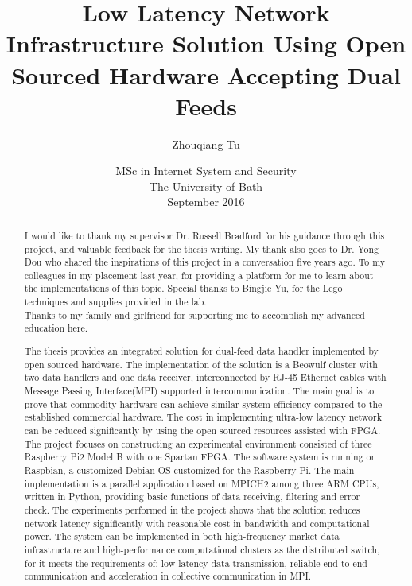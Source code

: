 \documentclass[11pt,openright,a4paper]{report}
\title{Low Latency Network Infrastructure Solution Using Open Sourced Hardware Accepting Dual Feeds}
\author{Zhouqiang Tu}
\date{MSc in Internet System and Security\\The University of Bath\\September 2016}
\begin{document}
\lstset{language=Java,breaklines,breakatwhitespace,basicstyle=\small}


\setcounter{page}{0}


\maketitle
\newpage


\newpage


\newpage
\renewcommand{\abstractname}{Acknowledgements}
\begin{abstract}
I would like to thank my supervisor Dr. Russell Bradford for his guidance through this project, and valuable feedback for the thesis writing. My thank also goes to Dr. Yong Dou who shared the inspirations of this project in a conversation five years ago. To my colleagues in my placement last year, for providing a platform for me to learn about the implementations of this topic. Special thanks to Bingjie Yu, for the Lego techniques and supplies provided in the lab.\\
Thanks to my family and girlfriend for supporting me to accomplish my advanced education here.\\
\end{abstract}

\renewcommand{\abstractname}{Abstract}
\begin{abstract}
	The thesis provides an integrated solution for dual-feed data handler implemented by open sourced hardware. The implementation of the solution is a Beowulf cluster with two data handlers and one data receiver, interconnected by RJ-45 Ethernet cables with Message Passing Interface(MPI) supported intercommunication. The main goal is to prove that commodity hardware can achieve similar system efficiency compared to the established commercial hardware. The cost in implementing ultra-low latency network can be reduced significantly by using the open sourced resources assisted with FPGA. The project focuses on constructing an experimental environment consisted of three Raspberry Pi2 Model B with one Spartan FPGA. The software system is running on Raspbian, a customized Debian OS customized for the Raspberry Pi. The main implementation is a parallel application based on MPICH2 among three ARM CPUs, written in Python, providing basic functions of data receiving,  filtering and error check. The experiments performed in the project shows that the solution reduces network latency significantly with reasonable cost in bandwidth and computational power. The system can be implemented in both high-frequency market data infrastructure and high-performance computational clusters as the distributed switch, for it meets the requirements of: low-latency data transmission, reliable end-to-end communication and acceleration in collective communication in MPI.
\end{abstract}
\end{document}

